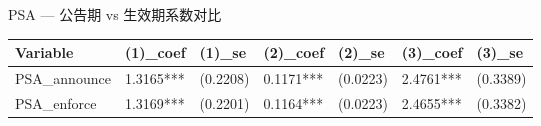 \caption{PSA — 公告期 vs 生效期系数对比}
\begin{tabular}{lllllll}
\toprule
Variable & (1)_coef & (1)_se & (2)_coef & (2)_se & (3)_coef & (3)_se \\
\midrule
PSA_announce & 1.3165*** & (0.2208) & 0.1171*** & (0.0223) & 2.4761*** & (0.3389) \\
PSA_enforce & 1.3169*** & (0.2201) & 0.1164*** & (0.0223) & 2.4655*** & (0.3382) \\
\bottomrule
\end{tabular}
